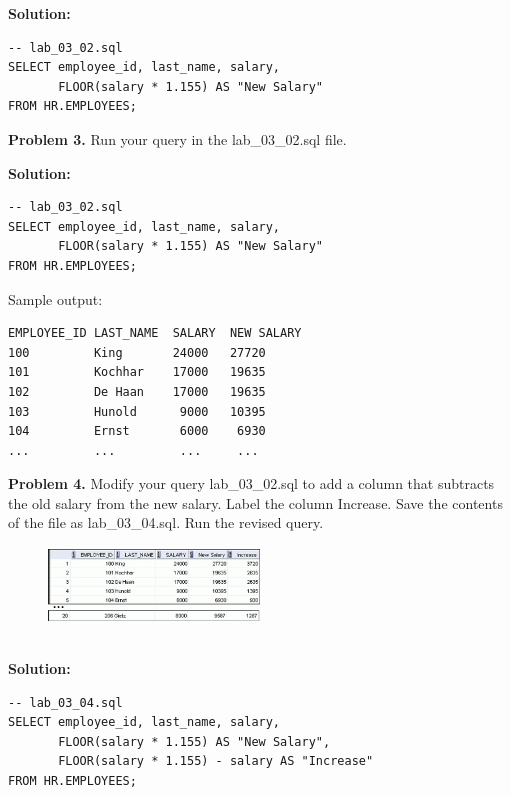 \documentclass[12pt,a4paper]{article}
\begin{document}
\textbf{Solution:}
\begin{lstlisting}[style=sqlstyle]
-- lab_03_02.sql
SELECT employee_id, last_name, salary,
       FLOOR(salary * 1.155) AS "New Salary"
FROM HR.EMPLOYEES;
\end{lstlisting}

\vspace{0.5cm}

\textbf{Problem 3.} Run your query in the lab\_03\_02.sql file.

\textbf{Solution:}
\begin{lstlisting}[style=sqlstyle]
-- lab_03_02.sql
SELECT employee_id, last_name, salary,
       FLOOR(salary * 1.155) AS "New Salary"
FROM HR.EMPLOYEES;
\end{lstlisting}

Sample output:
\begin{verbatim}
EMPLOYEE_ID LAST_NAME  SALARY  NEW SALARY
100         King       24000   27720
101         Kochhar    17000   19635
102         De Haan    17000   19635
103         Hunold      9000   10395
104         Ernst       6000    6930
...         ...         ...     ...
\end{verbatim}

\vspace{0.5cm}

\textbf{Problem 4.} Modify your query lab\_03\_02.sql to add a column that subtracts the old salary from the new salary. Label the column Increase. Save the contents of the file as lab\_03\_04.sql. Run the revised query.
\begin{figure}[htbp]
  \centering
  \includegraphics[width=0.5\textwidth]{Screenshots/34.png}
\end{figure}\\
\textbf{Solution:}
\begin{lstlisting}[style=sqlstyle]
-- lab_03_04.sql
SELECT employee_id, last_name, salary,
       FLOOR(salary * 1.155) AS "New Salary",
       FLOOR(salary * 1.155) - salary AS "Increase"
FROM HR.EMPLOYEES;
\end{lstlisting}

\vspace{0.5cm}
\end{document}

